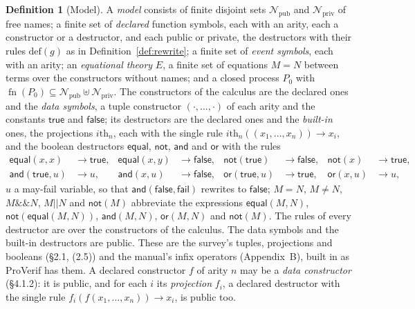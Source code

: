 \documentclass[11pt]{article}
\theoremstyle{definition}
\newtheorem{definition}{Definition}[section]
\theoremstyle{plain}
\theoremstyle{remark}
\newcommand{\fn}{\operatorname{fn}}
\begin{document}
\begin{definition}[Model]\label{def:model}
A \emph{model} consists of finite disjoint sets $\mathcal{N}_{\mathrm{pub}}$ and $\mathcal{N}_{\mathrm{priv}}$ of free names; a finite set of \emph{declared} function symbols, each with an arity, each a constructor or a destructor, and each public or private, the destructors with their rules $\mathrm{def}(g)$ as in Definition~\ref{def:rewrite}; a finite set of \emph{event symbols}, each with an arity; an \emph{equational theory} $E$, a finite set of equations $M=N$ between terms over the constructors without names; and a closed process $P_0$ with $\fn(P_0)\subseteq\mathcal{N}_{\mathrm{pub}}\uplus\mathcal{N}_{\mathrm{priv}}$. The constructors of the calculus are the declared ones and the \emph{data symbols}, a tuple constructor $(\cdot,\dots,\cdot)$ of each arity and the constants $\mathsf{true}$ and $\mathsf{false}$; its destructors are the declared ones and the \emph{built-in} ones, the projections $i\mathrm{th}_n$, each with the single rule $i\mathrm{th}_n((x_1,\dots,x_n))\to x_i$, and the boolean destructors $\mathsf{equal}$, $\mathsf{not}$, $\mathsf{and}$ and $\mathsf{or}$ with the rules
\begin{align*}
\mathsf{equal}(x,x)&\to\mathsf{true}, & \mathsf{equal}(x,y)&\to\mathsf{false}, & \mathsf{not}(\mathsf{true})&\to\mathsf{false}, & \mathsf{not}(x)&\to\mathsf{true},\\
\mathsf{and}(\mathsf{true},u)&\to u, & \mathsf{and}(x,u)&\to\mathsf{false}, & \mathsf{or}(\mathsf{true},u)&\to\mathsf{true}, & \mathsf{or}(x,u)&\to u,
\end{align*}
$u$ a may-fail variable, so that $\mathsf{and}(\mathsf{false},\mathsf{fail})$ rewrites to $\mathsf{false}$; $M=N$, $M\neq N$, $M\mathbin{\&\&}N$, $M\mathbin{||}N$ and $\mathsf{not}(M)$ abbreviate the expressions $\mathsf{equal}(M,N)$, $\mathsf{not}(\mathsf{equal}(M,N))$, $\mathsf{and}(M,N)$, $\mathsf{or}(M,N)$ and $\mathsf{not}(M)$. The rules of every destructor are over the constructors of the calculus. The data symbols and the built-in destructors are public. These are the survey's tuples, projections and booleans (\S2.1, (2.5)) and the manual's infix operators (Appendix~B), built in as ProVerif has them. A declared constructor $f$ of arity $n$ may be a \emph{data constructor} (\S4.1.2): it is public, and for each $i$ its \emph{projection} $f_i$, a declared destructor with the single rule $f_i(f(x_1,\dots,x_n))\to x_i$, is public too.
\end{definition}
\end{document}
